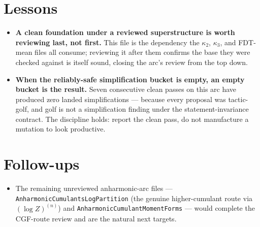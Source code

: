 \documentclass[11pt]{article}
\begin{document}
\section{Lessons}
\begin{itemize}[noitemsep]
  \item \textbf{A clean foundation under a reviewed superstructure is worth reviewing last, not first.} This
    file is the dependency the $\kappa_2$, $\kappa_3$, and FDT-mean files all consume; reviewing it after them
    confirms the base they were checked against is itself sound, closing the arc's review from the top down.
  \item \textbf{When the reliably-safe simplification bucket is empty, an empty bucket is the result.} Seven
    consecutive clean passes on this arc have produced zero landed simplifications --- because every proposal
    was tactic-golf, and golf is not a simplification finding under the statement-invariance contract. The
    discipline holds: report the clean pass, do not manufacture a mutation to look productive.
\end{itemize}

\section{Follow-ups}
\begin{itemize}[noitemsep]
  \item The remaining unreviewed anharmonic-arc files --- \texttt{AnharmonicCumulantsLogPartition} (the genuine
    higher-cumulant route via $(\log Z)^{(n)}$) and \texttt{AnharmonicCumulantMomentForms} --- would complete
    the CGF-route review and are the natural next targets.
\end{itemize}
\end{document}
